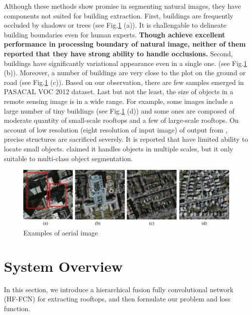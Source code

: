 \documentclass[runningheads]{llncs}
\begin{document}
   Although these methods show promise in segmenting natural images, they have components not suited for building extraction. First, buildings are frequently occluded by shadows or trees (see Fig.\ref{fig:AerialImages} (a)). It is challengable to delineate building boundaries even for human experts. \textbf{Though \cite{chen14semantic}\cite{Zheng2015Conditional} achieve excellent performance in processing boundary of natural image, neither of them reported that they have strong ability to handle occlusions.} Second, buildings have significantly variational appearance even in a single one. (see Fig.\ref{fig:AerialImages} (b)). Moreover, a number of buildings are very close to the plot on the ground or road (see Fig.\ref{fig:AerialImages} (c)). Based on our observation, there are few samples emerged in PASACAL VOC 2012 dataset. Last but not the least, the size of objects in a remote sensing image is in a wide range. For example, some images include a large number of tiny buildings (see Fig.\ref{fig:AerialImages} (d)) and some ones are composed of moderate quantity of small-scale rooftops and a few of large-scale rooftops. On account of low resolution (eight resolution of input image) of output from \cite{Long2014Fully}, precise structures are sacrificed severely. It is reported that \cite{Long2014Fully} have limited ability to locate small objects. \cite{Noh2015Learning} claimed  it handles objects in multiple scales, but it only suitable to multi-class object segmentation. 

\begin{figure}
\centering
\label{fig:AerialImages}
\includegraphics[width=120mm]{AerialImages}
\caption{Examples of aerial image}
\end{figure}

\section{System Overview} 
   In this section, we introduce a hierarchical fusion fully convolutional network (HF-FCN) for extracting rooftops, and then formulate our problem and loss function.
         
\end{document}
